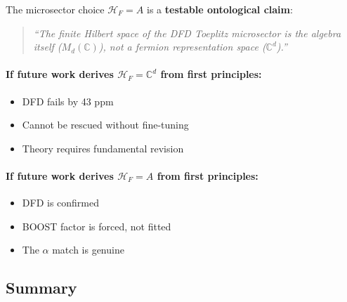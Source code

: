 The microsector choice $\mathcal{H}_F = A$ is a \textbf{testable ontological claim}:

\begin{quote}
\emph{``The finite Hilbert space of the DFD Toeplitz microsector is the algebra itself ($M_d(\mathbb{C})$), not a fermion representation space ($\mathbb{C}^d$).''}
\end{quote}

\paragraph{If future work derives $\mathcal{H}_F = \mathbb{C}^d$ from first principles:}
\begin{itemize}
\item DFD fails by 43 ppm
\item Cannot be rescued without fine-tuning
\item Theory requires fundamental revision
\end{itemize}

\paragraph{If future work derives $\mathcal{H}_F = A$ from first principles:}
\begin{itemize}
\item DFD is confirmed
\item BOOST factor is forced, not fitted
\item The $\alpha$ match is genuine
\end{itemize}

\subsection{Summary}\label{sec:alpha-locked-summary}

